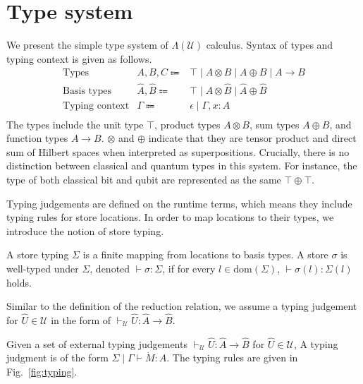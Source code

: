 \section{Type system} \label{sec:type-system}
We present the simple type system of $\Lambda(\mathcal{U})$ calculus.
Syntax of types and typing context is given as follows.
\begin{equation*}
  \begin{array}{lrl}
    \text{Types}          & A, B, C \Coloneqq          & \top\mid A\otimes B\mid A\oplus B\mid A\rightarrow B    \\
    \text{Basis types}    & \hat{A}, \hat{B} \Coloneqq & \top\mid\hat{A}\otimes \hat{B}\mid\hat{A}\oplus \hat{B} \\
    \text{Typing context} & \Gamma \Coloneqq           & \epsilon \mid \Gamma,x:A                                \\
  \end{array}
\end{equation*}
The types include the unit type $\top$, product types $A \otimes B$, sum types $A \oplus B$, and function types $A \rightarrow B$.
$\otimes$ and $\oplus$ indicate that they are tensor product and direct sum of Hilbert spaces when interpreted as superpositions.
Crucially, there is no distinction between classical and quantum types in this system.
For instance, the type of both classical bit and qubit are represented as the same $\top \oplus \top$.

Typing judgements are defined on the runtime terms, which means they include typing rules for store locations.
In order to map locations to their types, we introduce the notion of store typing.
\begin{dfn}
  A store typing $\Sigma$ is a finite mapping from locations to basis types.
  A store $\sigma$ is well-typed under $\Sigma$, denoted $\vdash \sigma : \Sigma$, if for every $l\in\text{dom}(\Sigma)$, $\vdash \sigma(l) : \Sigma(l)$ holds.
\end{dfn}

Similar to the definition of the reduction relation, we assume a typing judgement for $\hat{U}\in\mathcal{U}$ in the form of $\vdash_\mathcal{U} \hat{U} : \hat{A} \rightarrow \hat{B}$.
\begin{dfn}
  Given a set of external typing judgements $\vdash_\mathcal{U} \hat{U} : \hat{A} \rightarrow \hat{B}$ for $\hat{U}\in\mathcal{U}$,
  A typing judgment is of the form $\Sigma \mid \Gamma \vdash \dot{M} : A$.
  The typing rules are given in Fig.~\ref{fig:typing}.
\end{dfn}

